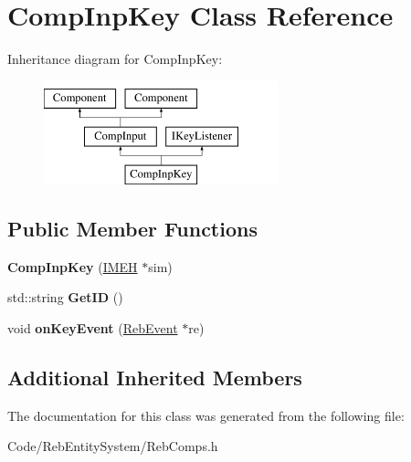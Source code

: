 \hypertarget{class_comp_inp_key}{}\section{Comp\+Inp\+Key Class Reference}
\label{class_comp_inp_key}
Inheritance diagram for Comp\+Inp\+Key\+:\begin{figure}[H]
\begin{center}
\leavevmode
\includegraphics[height=3.000000cm]{class_comp_inp_key}
\end{center}
\end{figure}
\subsection*{Public Member Functions}
\begin{DoxyCompactItemize}
\item 
{\bfseries Comp\+Inp\+Key} (\hyperlink{class_i_m_e_h}{I\+M\+EH} $\ast$sim)\hypertarget{class_comp_inp_key_a30ce505e5adc0b7de796a99fb3370740}{}\label{class_comp_inp_key_a30ce505e5adc0b7de796a99fb3370740}

\item 
std\+::string {\bfseries Get\+ID} ()\hypertarget{class_comp_inp_key_a4229c301203afb531aee44d774396500}{}\label{class_comp_inp_key_a4229c301203afb531aee44d774396500}

\item 
void {\bfseries on\+Key\+Event} (\hyperlink{union_reb_event}{Reb\+Event} $\ast$re)\hypertarget{class_comp_inp_key_aa5c99c1048a2a5dc89863c222fd1cf61}{}\label{class_comp_inp_key_aa5c99c1048a2a5dc89863c222fd1cf61}

\end{DoxyCompactItemize}
\subsection*{Additional Inherited Members}


The documentation for this class was generated from the following file\+:\begin{DoxyCompactItemize}
\item 
Code/\+Reb\+Entity\+System/Reb\+Comps.\+h\end{DoxyCompactItemize}
